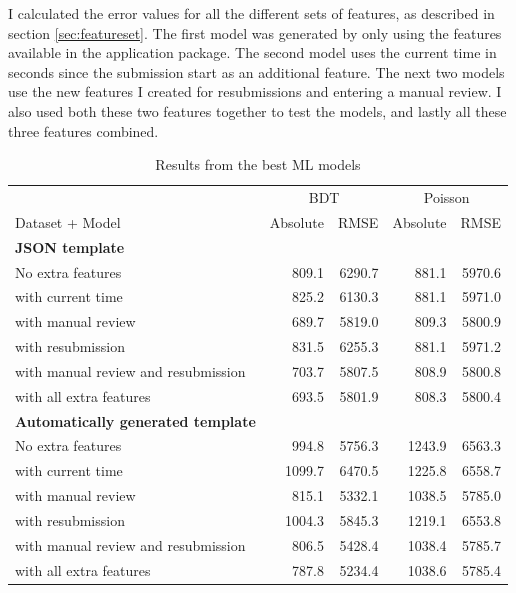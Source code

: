 I calculated the error values for all the different sets of features, as described in section \ref{sec:featureset}.
The first model was generated by only using the features available in the application package.
The second model uses the current time in seconds since the submission start as an additional feature.
The next two models use the new features I created for resubmissions and entering a manual review.
I also used both these two features together to test the models, and lastly all these three features combined.

\begin{table}[htb]
\begin{center}
\begin{tabularx}{\linewidth}{| X | r | r | r | r |}
\hline
~ & \multicolumn{2}{c|}{BDT} & \multicolumn{2}{c|}{Poisson} \\
Dataset + Model & Absolute & RMSE & Absolute & RMSE \\
\hline
\textbf{JSON template} &  &  &  &  \\
No extra features                   & 809.1 & 6290.7 & 881.1 & 5970.6 \\
with current time                   & 825.2 & 6130.3 & 881.1 & 5971.0 \\
with manual review                  & 689.7 & 5819.0 & 809.3 & 5800.9 \\
with resubmission                   & 831.5 & 6255.3 & 881.1 & 5971.2 \\
with manual review and resubmission & 703.7 & 5807.5 & 808.9 & 5800.8 \\
with all extra features             & 693.5 & 5801.9 & 808.3 & 5800.4 \\
\hline
\textbf{Automatically generated template} &  &  &  &  \\
No extra features                   & 994.8 & 5756.3 & 1243.9 & 6563.3 \\
with current time                   & 1099.7 & 6470.5 & 1225.8 & 6558.7 \\
with manual review                  & 815.1 & 5332.1 & 1038.5 & 5785.0 \\
with resubmission                   & 1004.3 & 5845.3 & 1219.1 & 6553.8 \\
with manual review and resubmission & 806.5 & 5428.4 & 1038.4 & 5785.7 \\
with all extra features             & 787.8 & 5234.4 & 1038.6 & 5785.4 \\
\hline
\end{tabularx}
\end{center}
\caption{Results from the best ML models}
\label{tab:mlresults}
\end{table}

